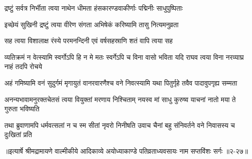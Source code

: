 \twolineshloka
{द्रष्टुं सर्वत्र निर्भीता त्वया नाथेन धीमता}
{हंसकारण्डवाकीर्णाः पद्मिनीः साधुपुष्पिताः} %

\twolineshloka
{इच्छेयं सुखिनी द्रष्टुं त्वया वीरेण संगता}
{अभिषेकं करिष्यामि तासु नित्यमनुव्रता} %

\twolineshloka
{सह त्वया विशालाक्ष रंस्ये परमनन्दिनी}
{एवं वर्षसहस्राणि शतं वापि त्वया सह} %

\threelineshloka
{व्यतिक्रमं न वेत्स्यामि स्वर्गोऽपि हि न मे मतः}
{स्वर्गेऽपि च विना वासो भविता यदि राघव}
{त्वया विना नरव्याघ्र नाहं तदपि रोचये} %

\twolineshloka
{अहं गमिष्यामि वनं सुदुर्गमं मृगायुतं वानरवारणैश्च}
{वने निवत्स्यामि यथा पितुर्गृहे तवैव पादावुपगृह्य सम्मता} %

\twolineshloka
{अनन्यभावामनुरक्तचेतसं त्वया वियुक्तां मरणाय निश्चिताम्}
{नयस्व मां साधु कुरुष्व याचनां नातो मया ते गुरुता भविष्यति} %

\twolineshloka
{तथा ब्रुवाणामपि धर्मवत्सलां न च स्म सीतां नृवरो निनीषति}
{उवाच चैनां बहु संनिवर्तने वने निवासस्य च दुःखितां प्रति} %


॥इत्यार्षे श्रीमद्रामायणे वाल्मीकीये आदिकाव्ये अयोध्याकाण्डे पतिव्रताध्यवसायः नाम सप्तविंशः सर्गः ॥२-२७॥
